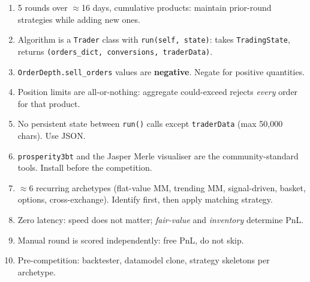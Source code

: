 \begin{enumerate}
  \item 5 rounds over $\approx$16 days, cumulative products: maintain
  prior-round strategies while adding new ones.

  \item Algorithm is a \texttt{Trader} class with
  \texttt{run(self, state)}: takes \texttt{TradingState}, returns
  \texttt{(orders\_dict, conversions, traderData)}.

  \item \texttt{OrderDepth.sell\_orders} values are \textbf{negative}.
  Negate for positive quantities.

  \item Position limits are all-or-nothing: aggregate could-exceed
  rejects \emph{every} order for that product.

  \item No persistent state between \texttt{run()} calls except
  \texttt{traderData} (max 50{,}000 chars).  Use JSON.

  \item \texttt{prosperity3bt} and the Jasper Merle visualiser are the
  community-standard tools.  Install before the competition.

  \item $\approx$6 recurring archetypes (flat-value MM, trending MM,
  signal-driven, basket, options, cross-exchange).  Identify first, then
  apply matching strategy.

  \item Zero latency: speed does not matter; \emph{fair-value} and
  \emph{inventory} determine PnL.

  \item Manual round is scored independently: free PnL, do not skip.

  \item Pre-competition: backtester, datamodel clone, strategy
  skeletons per archetype.
\end{enumerate}
